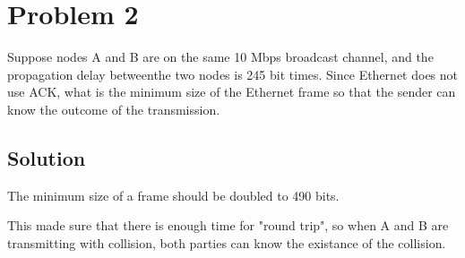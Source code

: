
\section*{Problem 2}

Suppose nodes A and B are on the same 10 Mbps broadcast channel, and the propagation delay betweenthe two nodes is 245 bit times.
Since Ethernet does not use ACK, what is the minimum size of the Ethernet frame so that the sender can know the outcome of the transmission.

\subsection*{Solution}

The minimum size of a frame should be doubled to 490 bits.

This made sure that there is enough time for "round trip", so when A and B are transmitting with collision, both parties can know the existance of the collision.
